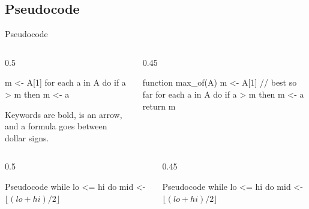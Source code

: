 \subsection{Pseudocode}
\begin{frame}{Pseudocode}
\begin{columns}[T,onlytextwidth]
\begin{column}{0.5\textwidth}
\begin{codedoc}
\begin{pseudocode}
  m <- A[1]
  for each a in A do
    if a > m then m <- a
\end{pseudocode}
\end{codedoc}
Keywords are bold, \code{<-} is an arrow, and a formula goes between dollar signs.
\end{column}
\begin{column}{0.45\textwidth}
\stepoffset
\begin{pseudocode}
function max_of(A)
    m <- A[1]            // best so far
    for each a in A do
        if a > m then m <- a
    return m
\end{pseudocode}
\end{column}
\end{columns}
\bigskip
\begin{columns}[T,onlytextwidth]
\begin{column}{0.5\textwidth}
\begin{codedoc}
\begin{codeblock}{Pseudocode}
  while lo <= hi do
    mid <- $\lfloor (lo+hi)/2 \rfloor$
\end{codeblock}
\end{codedoc}
\end{column}
\begin{column}{0.45\textwidth}
\stepoffset
\begin{codeblock}{Pseudocode}
while lo <= hi do
    mid <- $\lfloor (lo+hi)/2 \rfloor$
\end{codeblock}
\end{column}
\end{columns}
\end{frame}
